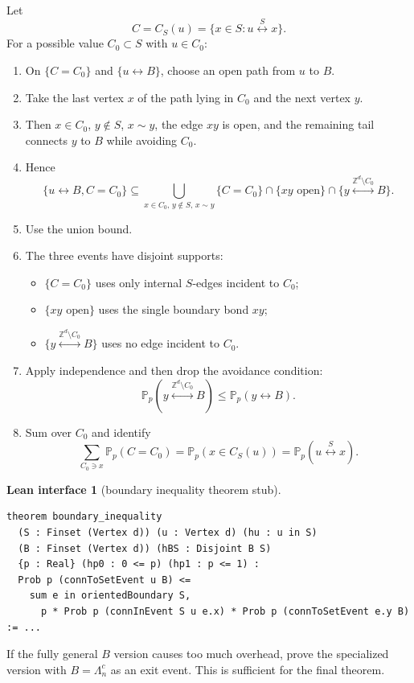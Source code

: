 \documentclass[11pt]{article}
\newcommand{\Z}{\mathbb Z}
\newcommand{\PP}{\mathbb P}
\newcommand{\conn}{\longleftrightarrow}
\newcommand{\Lam}{\Lambda}
\theoremstyle{definition}
\newtheorem{interface}[definition]{Lean interface}
\theoremstyle{plain}
\begin{document}
Let
\[
  C=C_S(u)=\{x\in S:u\stackrel S\conn x\}.
\]
For a possible value $C_0\subset S$ with $u\in C_0$:
\begin{enumerate}[leftmargin=1.4em]
  \item On $\{C=C_0\}$ and $\{u\conn B\}$, choose an open path from $u$ to $B$.
  \item Take the last vertex $x$ of the path lying in $C_0$ and the next vertex $y$.
  \item Then $x\in C_0$, $y\notin S$, $x\sim y$, the edge $xy$ is open, and the remaining tail connects $y$ to $B$ while avoiding $C_0$.
  \item Hence
  \[
    \{u\conn B, C=C_0\}
    \subseteq
    \bigcup_{x\in C_0,\,y\notin S,\,x\sim y}
    \{C=C_0\}\cap\{xy\text{ open}\}
    \cap\{y\stackrel{\Z^d\setminus C_0}{\conn}B\}.
  \]
  \item Use the union bound.
  \item The three events have disjoint supports:
  \begin{itemize}
    \item $\{C=C_0\}$ uses only internal $S$-edges incident to $C_0$;
    \item $\{xy\text{ open}\}$ uses the single boundary bond $xy$;
    \item $\{y\stackrel{\Z^d\setminus C_0}{\conn}B\}$ uses no edge incident to $C_0$.
  \end{itemize}
  \item Apply independence and then drop the avoidance condition:
  \[
    \PP_p(y\stackrel{\Z^d\setminus C_0}{\conn}B)
    \le \PP_p(y\conn B).
  \]
  \item Sum over $C_0$ and identify
  \[
    \sum_{C_0\ni x}\PP_p(C=C_0)=\PP_p(x\in C_S(u))=
    \PP_p(u\stackrel S\conn x).
  \]
\end{enumerate}

\begin{interface}[boundary inequality theorem stub]
\begin{lstlisting}
theorem boundary_inequality
  (S : Finset (Vertex d)) (u : Vertex d) (hu : u in S)
  (B : Finset (Vertex d)) (hBS : Disjoint B S)
  {p : Real} (hp0 : 0 <= p) (hp1 : p <= 1) :
  Prob p (connToSetEvent u B) <=
    sum e in orientedBoundary S,
      p * Prob p (connInEvent S u e.x) * Prob p (connToSetEvent e.y B) := ...
\end{lstlisting}
\end{interface}

If the fully general $B$ version causes too much overhead, prove the specialized version with $B=\Lam_n^c$ as an exit event.  This is sufficient for the final theorem.
\end{document}
